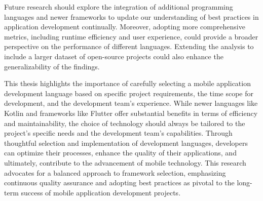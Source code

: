 \par
Future research should explore the integration of additional programming languages and newer frameworks to update our understanding of best practices in application development continually. Moreover, adopting more comprehensive metrics, including runtime efficiency and user experience, could provide a broader perspective on the performance of different languages. Extending the analysis to include a larger dataset of open-source projects could also enhance the generalizability of the findings.
\par
This thesis highlights the importance of carefully selecting a mobile application development language based on specific project requirements, the time scope for development, and the development team’s experience. While newer languages like Kotlin and frameworks like Flutter offer substantial benefits in terms of efficiency and maintainability, the choice of technology should always be tailored to the project's specific needs and the development team's capabilities. Through thoughtful selection and implementation of development languages, developers can optimize their processes, enhance the quality of their applications, and ultimately, contribute to the advancement of mobile technology. This research advocates for a balanced approach to framework selection, emphasizing continuous quality assurance and adopting best practices as pivotal to the long-term success of mobile application development projects.
